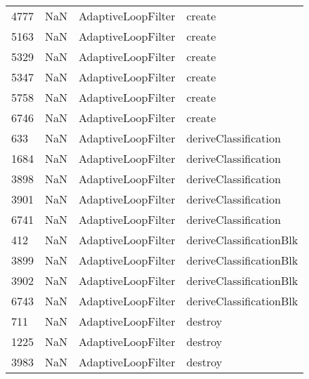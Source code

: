 \begin{tabular}{llll}
4777 &                   NaN &         AdaptiveLoopFilter &                                    create \\
5163 &                   NaN &         AdaptiveLoopFilter &                                    create \\
5329 &                   NaN &         AdaptiveLoopFilter &                                    create \\
5347 &                   NaN &         AdaptiveLoopFilter &                                    create \\
5758 &                   NaN &         AdaptiveLoopFilter &                                    create \\
6746 &                   NaN &         AdaptiveLoopFilter &                                    create \\
633  &                   NaN &         AdaptiveLoopFilter &                      deriveClassification \\
1684 &                   NaN &         AdaptiveLoopFilter &                      deriveClassification \\
3898 &                   NaN &         AdaptiveLoopFilter &                      deriveClassification \\
3901 &                   NaN &         AdaptiveLoopFilter &                      deriveClassification \\
6741 &                   NaN &         AdaptiveLoopFilter &                      deriveClassification \\
412  &                   NaN &         AdaptiveLoopFilter &                   deriveClassificationBlk \\
3899 &                   NaN &         AdaptiveLoopFilter &                   deriveClassificationBlk \\
3902 &                   NaN &         AdaptiveLoopFilter &                   deriveClassificationBlk \\
6743 &                   NaN &         AdaptiveLoopFilter &                   deriveClassificationBlk \\
711  &                   NaN &         AdaptiveLoopFilter &                                   destroy \\
1225 &                   NaN &         AdaptiveLoopFilter &                                   destroy \\
3983 &                   NaN &         AdaptiveLoopFilter &                                   destroy \\

\end{tabular}
